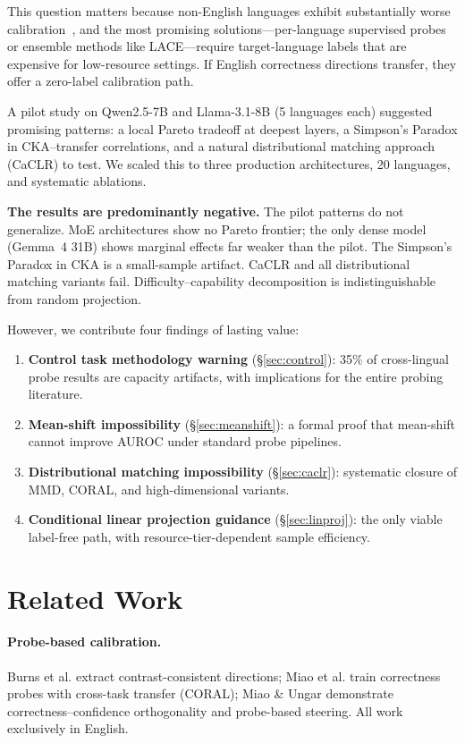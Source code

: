 \documentclass[11pt,a4paper]{article}
\begin{document}
This question matters because non-English languages exhibit substantially worse calibration~\cite{ahuja2024globalmmlu}, and the most promising solutions---per-language supervised probes or ensemble methods like LACE---require target-language labels that are expensive for low-resource settings.
If English correctness directions transfer, they offer a zero-label calibration path.

A pilot study on Qwen2.5-7B and Llama-3.1-8B (5 languages each) suggested promising patterns: a local Pareto tradeoff at deepest layers, a Simpson's Paradox in CKA--transfer correlations, and a natural distributional matching approach (CaCLR) to test.
We scaled this to three production architectures, 20 languages, and systematic ablations.

\textbf{The results are predominantly negative.}
The pilot patterns do not generalize.
MoE architectures show no Pareto frontier; the only dense model (Gemma~4 31B) shows marginal effects far weaker than the pilot.
The Simpson's Paradox in CKA is a small-sample artifact.
CaCLR and all distributional matching variants fail.
Difficulty--capability decomposition is indistinguishable from random projection.

However, we contribute four findings of lasting value:
\begin{enumerate}
\item \textbf{Control task methodology warning} (\S\ref{sec:control}): 35\% of cross-lingual probe results are capacity artifacts, with implications for the entire probing literature.
\item \textbf{Mean-shift impossibility} (\S\ref{sec:meanshift}): a formal proof that mean-shift cannot improve AUROC under standard probe pipelines.
\item \textbf{Distributional matching impossibility} (\S\ref{sec:caclr}): systematic closure of MMD, CORAL, and high-dimensional variants.
\item \textbf{Conditional linear projection guidance} (\S\ref{sec:linproj}): the only viable label-free path, with resource-tier-dependent sample efficiency.
\end{enumerate}

\section{Related Work}
\label{sec:related}

\paragraph{Probe-based calibration.}
Burns et al. extract contrast-consistent directions; Miao et al. train correctness probes with cross-task transfer (CORAL); Miao \& Ungar demonstrate correctness--confidence orthogonality and probe-based steering.
All work exclusively in English.
\end{document}

